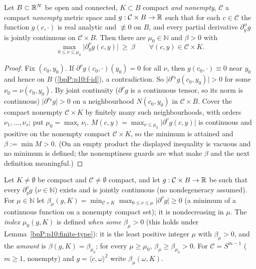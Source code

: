 \begin{lemma}[Finite type on a compact set; CP09 Lemma~1 = Rus01 Lemma~18.2]\label{bpP:p10:finite-type}
Let $B\subset\mathbb{R}^N$ be open and connected, $K\subset B$ compact \emph{and nonempty}, $\mathcal C$ a compact \emph{nonempty} metric space and $g:\mathcal C\times B\to\mathbb{R}$ such that for each $c\in\mathcal C$ the function $g(c,\cdot)$ is real analytic and $\not\equiv0$ on $B$, and every partial derivative $\partial_y^\alpha g$ is jointly continuous on $\mathcal C\times B$. Then there are $\mu_0\in\mathbb N$ and $\beta>0$ with
\[\max_{0\le\nu\le\mu_0}\lvert\partial_y^\nu g(c,y)\rvert\ \ge\ \beta\qquad\forall(c,y)\in\mathcal C\times K .\]
\end{lemma}
\begin{proof}
\label{stepP:p10:ft-pt} Fix $(c_0,y_0)$. If $\partial^\nu g(c_0,\cdot)(y_0)=0$ for all $\nu$, then $g(c_0,\cdot)\equiv0$ near $y_0$ and hence on $B$ (\ref{bpP:p10:f-id}), a contradiction. So $\lvert\partial^{\nu_0}g(c_0,y_0)\rvert>0$ for some $\nu_0=\nu(c_0,y_0)$.
\label{stepP:p10:ft-cover} By joint continuity ($\partial^\nu g$ is a continuous tensor, so its norm is continuous) $\lvert\partial^{\nu_0}g\rvert>0$ on a neighbourhood $N(c_0,y_0)$ in $\mathcal C\times B$. Cover the compact nonempty $\mathcal C\times K$ by finitely many such neighbourhoods, with orders $\nu_1,\dots,\nu_s$; put $\mu_0=\max_i\nu_i$.
\label{stepP:p10:ft-min} $M(c,y)=\max_{\nu\le\mu_0}\lvert\partial^\nu g(c,y)\rvert$ is continuous and positive on the nonempty compact $\mathcal C\times K$, so the minimum is attained and $\beta:=\min M>0$. (On an empty product the displayed inequality is vacuous and no minimum is defined; the nonemptiness guards are what make $\beta$ and the next definition meaningful.)
\end{proof}

\begin{definition}\label{bpP:p10:index-def}
Let $K\ne\emptyset$ be compact and $\mathcal C\ne\emptyset$ compact, and let $g:\mathcal C\times B\to\mathbb{R}$ be such that every $\partial_y^\nu g$ ($\nu\in\mathbb N$) exists and is jointly continuous (no nondegeneracy assumed). For $\mu\in\mathbb N$ let $\beta_\mu(g,K)=\min_{\mathcal C\times K}\max_{0\le\nu\le\mu}\lvert\partial^\nu g\rvert\ge0$ (a minimum of a continuous function on a nonempty compact set); it is nondecreasing in $\mu$. The \emph{index} $\mu_0(g,K)$ is defined \emph{when some $\beta_\mu>0$} (this holds under Lemma~\ref{bpP:p10:finite-type}): it is the least positive integer $\mu$ with $\beta_\mu>0$, and the \emph{amount} is $\beta(g,K)=\beta_{\mu_0}$; for every $\mu\ge\mu_0$, $\beta_\mu\ge\beta_{\mu_0}>0$. For $\mathcal C=S^{m-1}$ ($m\ge1$, nonempty) and $g=\langle c,\omega\rangle^2$ write $\beta_\mu(\omega,K)$.
\end{definition}

